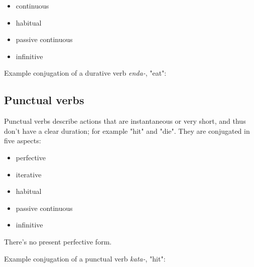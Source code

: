 \begin{itemize}
	\item continuous
	\item habitual
	\item passive continuous
	\item infinitive
\end{itemize}

Example conjugation of a durative verb \emph{enda-}, "eat":


\subsection{Punctual verbs}

Punctual verbs describe actions that are instantaneous or very short, and thus
don't have a clear duration; for example "hit" and "die". They are conjugated in
five aspects:

\begin{itemize}
	\item perfective
	\item iterative
	\item habitual
	\item passive continuous
	\item infinitive
\end{itemize}

There's no present perfective form.

Example conjugation of a punctual verb \emph{kata-}, "hit":

